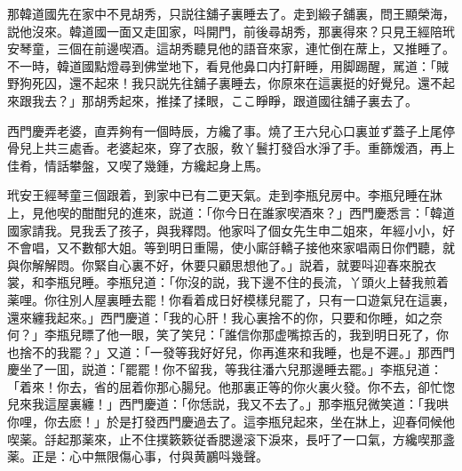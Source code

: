 那韓道國先在家中不見胡秀，只説往舖子裏睡去了。走到緞子舖裏，問王顯榮海，説他沒來。韓道國一面又走囬家，呌開門，前後尋胡秀，那裏得來？只見王經陪玳安琴童，三個在前邊喫酒。這胡秀聽見他的語音來家，連忙倒在蓆上，又推睡了。不一時，韓道國點燈尋到佛堂地下，看見他鼻口内打鼾睡，用脚踢醒，駡道：「賊野狗死囚，還不起來！我只説先往舖子裏睡去，你原來在這裏挺的好覺兒。還不起來跟我去？」那胡秀起來，推揉了揉眼，ここ睜睜，跟道國往舖子裏去了。

西門慶弄老婆，直弄夠有一個時辰，方纔了事。燒了王六兒心口裏並ず蓋子上尾停骨兒上共三處香。老婆起來，穿了衣服，敎丫鬟打發舀水淨了手。重篩煖酒，再上佳肴，情話攀盤，又喫了幾鍾，方纔起身上馬。

玳安王經琴童三個跟着，到家中已有二更天氣。走到李瓶兒房中。李瓶兒睡在牀上，見他喫的酣酣兒的進來，説道：「你今日在誰家喫酒來？」西門慶悉言：「韓道國家請我。見我丢了孩子，與我釋悶。他家呌了個女先生申二姐來，年經小小，好不會唱，又不數郁大姐。等到明日重陽，使小廝㧱轎子接他來家唱兩日你們聽，就與你解解悶。你緊自心裏不好，休要只顧思想他了。」説着，就要呌迎春來脫衣裳，和李瓶兒睡。李瓶兒道：「你沒的説，我下邊不住的長流，丫頭火上替我煎着薬哩。你往別人屋裏睡去罷！你看着成日好模樣兒罷了，只有一口遊氣兒在這裏，還來纏我起來。」西門慶道：「我的心肝！我心裏捨不的你，只要和你睡，如之奈何？」李瓶兒瞟了他一眼，笑了笑兒：「誰信你那虚嘴掠舌的，我到明日死了，你也捨不的我罷？」又道：「一發等我好好兒，你再進來和我睡，也是不遲。」那西門慶坐了一囬，説道：「罷罷！你不留我，等我往潘六兒那邊睡去罷。」李瓶兒道：「着來！你去，省的屈着你那心腸兒。他那裏正等的你火裏火發。你不去，卻忙愡兒來我這屋裏纏！」西門慶道：「你恁説，我又不去了。」那李瓶兒微笑道：「我哄你哩，你去麽！」於是打發西門慶過去了。這李瓶兒起來，坐在牀上，迎春伺候他喫薬。㧱起那薬來，止不住撲簌簌従香腮邊滚下淚來，長吁了一口氣，方纔喫那盞薬。正是：心中無限傷心事，付與黄鸝呌幾聲。

